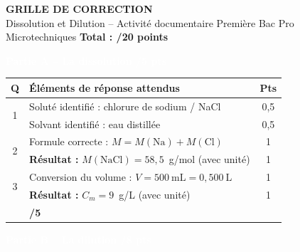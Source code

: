 \documentclass[10pt,a4paper]{article}
\newcommand{\exotitle}[2]{%
  \noindent\colorbox{exoheader}{%
    \parbox{\dimexpr\linewidth-2\fboxsep\relax}{%
      \textcolor{white}{\textbf{\large #1 \hfill #2}}%
    }%
  }%
}
\begin{document}
\begin{center}
  {\LARGE\textbf{GRILLE DE CORRECTION}}\\[1mm]
  {\large Dissolution et Dilution -- Activité documentaire \hspace{1cm}
  Première Bac Pro Microtechniques \hspace{1cm} \textbf{Total : /20 points}}
\end{center}

\vspace{3mm}

\exotitle{Partie A -- La dissolution}{/5 pts}

\vspace{1mm}

\begin{tabularx}{\linewidth}{|c|X|c|}
  \hline
  \rowcolor{exolight}
  \textbf{Q} & \textbf{Éléments de réponse attendus} & \textbf{Pts} \\
  \hline
  \multirow{2}{*}{1}
  & Soluté identifié : chlorure de sodium / NaCl
  & 0{,}5 \\
  \cline{2-3}
  & Solvant identifié : eau distillée
  & 0{,}5 \\
  \hline
  \multirow{2}{*}{2}
  & Formule correcte : $M = M(\text{Na}) + M(\text{Cl})$
  & 1 \\
  \cline{2-3}
  & \textbf{Résultat :} $M(\text{NaCl}) = 58{,}5$~g/mol (avec unité)
  & 1 \\
  \hline
  \multirow{2}{*}{3}
  & Conversion du volume : $V = 500~\text{mL} = 0{,}500~\text{L}$
  & 1 \\
  \cline{2-3}
  & \textbf{Résultat :} $C_m = 9$~g/L (avec unité)
  & 1 \\
  \hline
  \rowcolor{totalrow}
  \multicolumn{2}{|r|}{\textbf{Sous-total Partie A}} & \textbf{/5} \\
  \hline
\end{tabularx}

\vspace{4mm}

\exotitle{Partie B -- La dilution}{/8 pts}

\vspace{1mm}
\end{document}

